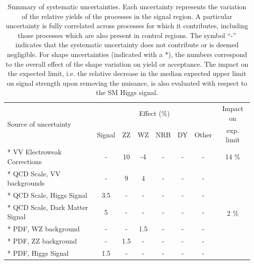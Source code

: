 \begin{table}[htb]
\caption{
Summary of systematic uncertainties.
Each uncertainty represents the variation of the relative yields of the processes in the signal region.
A particular uncertainty is fully correlated across processes for which it contributes, including those processes which are also present in control regions.
The symbol ``-'' indicates that the systematic uncertainty does not contribute or is deemed negligible.
For shape uncertainties (indicated with a *), the numbers correspond to the overall effect of the shape variation on yield or acceptance.
The impact on the expected limit, i.e. the relative decrease in the median expected upper limit on signal strength upon removing the nuisance, is also evaluated with respect to the SM Higgs signal.
\label{tab:syst}
} 
\centering
{\scriptsize
\setlength{\tabcolsep}{3pt} %
\begin{tabular}{lccccccc}
\hline
\multirow{2}{*}{Source of uncertainty}         & \multicolumn{6}{c}{Effect (\%)}                                              & Impact on   \\
                                               & Signal     & ZZ         & WZ         & NRB         & DY         & Other      & exp. limit  \\
\hline
* VV Electroweak Corrections                   & -          & 10         & -4         & -           & -          & -          & 14 \%      \\
* QCD Scale, VV backgrounds                    & -          & 9          & 4          & -           & -          & -          & \multirow{8}{*}{2 \%} \\
* QCD Scale, Higgs Signal                      & 3.5        & -          & -          & -           & -          & -          &            \\
* QCD Scale, Dark Matter Signal                & 5          & -          & -          & -           & -          & -          &            \\
* PDF, WZ background                           & -          & -          & 1.5        & -           & -          & -          &            \\
* PDF, ZZ background                           & -          & 1.5        & -          & -           & -          & -          &            \\
* PDF, Higgs Signal                            & 1.5        & -          & -          & -           & -          & -          &            \\

\end{tabular}}
\end{table}
